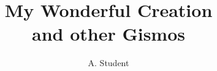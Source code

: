 \documentclass[12pt]{third-rep}
\title{My Wonderful Creation\\
  and other Gismos}
\author{A. Student}
\begin{document}
\dotitleandabstract

\tableofcontents
\listoffigures
\listoftables






\appendix

\end{document}
